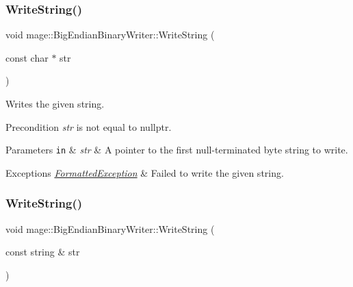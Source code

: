 \subsubsection{\texorpdfstring{Write\+String()}{WriteString()}\hspace{0.1cm}{\footnotesize\ttfamily [1/2]}}
{\footnotesize\ttfamily void mage\+::\+Big\+Endian\+Binary\+Writer\+::\+Write\+String (\begin{DoxyParamCaption}\item[{const char $\ast$}]{str }\end{DoxyParamCaption})\hspace{0.3cm}{\ttfamily [protected]}}

Writes the given string.

\begin{DoxyPrecond}{Precondition}
{\itshape str} is not equal to {\ttfamily nullptr}. 
\end{DoxyPrecond}

\begin{DoxyParams}[1]{Parameters}
\mbox{\tt in}  & {\em str} & A pointer to the first null-\/terminated byte string to write. \\
\hline
\end{DoxyParams}

\begin{DoxyExceptions}{Exceptions}
{\em \hyperlink{classmage_1_1_formatted_exception}{Formatted\+Exception}} & Failed to write the given string. \\
\hline
\end{DoxyExceptions}
\hypertarget{classmage_1_1_big_endian_binary_writer_a0cbee156086deb8999e609a2b355ff0e}{}\label{classmage_1_1_big_endian_binary_writer_a0cbee156086deb8999e609a2b355ff0e} 
\subsubsection{\texorpdfstring{Write\+String()}{WriteString()}\hspace{0.1cm}{\footnotesize\ttfamily [2/2]}}
{\footnotesize\ttfamily void mage\+::\+Big\+Endian\+Binary\+Writer\+::\+Write\+String (\begin{DoxyParamCaption}\item[{const string \&}]{str }\end{DoxyParamCaption})\hspace{0.3cm}{\ttfamily [protected]}}

